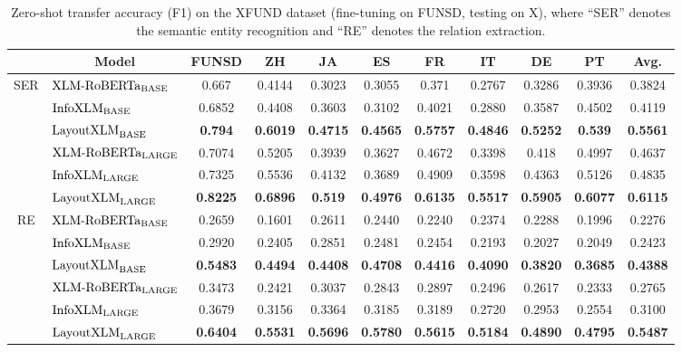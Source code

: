 \documentclass[11pt]{article}
\newcommand{\task}{\textsc{XFUND}\xspace}
\begin{document}
\begin{table*}[ht]
	\small
	\centering
	\begin{tabular}{c|lccccccccc}
		\toprule
& \multicolumn{1}{c}{\bf Model}      & \bf FUNSD & \bf ZH & \bf JA & \bf ES & \bf FR & \bf IT & \bf DE & \bf PT & \bf Avg. \\\midrule
		\multirow{6}{*}{SER} & $\textrm{XLM-RoBERTa}_{\rm BASE}$  & 0.667  & 0.4144 & 0.3023 & 0.3055 & 0.371  & 0.2767 & 0.3286 & 0.3936 & 0.3824 \\
		                    & $\textrm{InfoXLM}_{\rm BASE}$ & 0.6852 & 0.4408 & 0.3603 & 0.3102 & 0.4021 & 0.2880 & 0.3587 & 0.4502 & 0.4119 \\
		                    & $\textrm{LayoutXLM}_{\rm BASE}$    & \bf 0.794  & \bf 0.6019 & \bf 0.4715 & \bf 0.4565 & \bf 0.5757 & \bf 0.4846 & \bf 0.5252 & \bf 0.539 & \bf 0.5561 \\ \cmidrule{2-11}
		                    & $\textrm{XLM-RoBERTa}_{\rm LARGE}$ & 0.7074 & 0.5205 & 0.3939 & 0.3627 & 0.4672 & 0.3398 & 0.418  & 0.4997 & 0.4637 \\
		                    & $\textrm{InfoXLM}_{\rm LARGE}$     & 0.7325 & 0.5536 & 0.4132 & 0.3689 & 0.4909 & 0.3598 & 0.4363 & 0.5126 & 0.4835 \\
		                    & $\textrm{LayoutXLM}_{\rm LARGE}$   & \bf 0.8225 & \bf 0.6896 & \bf 0.519  & \bf 0.4976 & \bf 0.6135 & \bf 0.5517 & \bf 0.5905 & \bf 0.6077 & \bf 0.6115 \\\midrule
		\multirow{6}{*}{RE} & $\textrm{XLM-RoBERTa}_{\rm BASE}$  & 0.2659 & 0.1601 & 0.2611 & 0.2440 & 0.2240 & 0.2374 & 0.2288 & 0.1996 & 0.2276 \\
		                    & $\textrm{InfoXLM}_{\rm BASE}$      & 0.2920 & 0.2405 & 0.2851 & 0.2481 & 0.2454 & 0.2193 & 0.2027 & 0.2049 & 0.2423 \\
		                    & $\textrm{LayoutXLM}_{\rm BASE}$    & \bf 0.5483 & \bf 0.4494 & \bf 0.4408 & \bf 0.4708 & \bf 0.4416 & \bf 0.4090 & \bf 0.3820 & \bf 0.3685 & \bf 0.4388 \\ \cmidrule{2-11}
		                    & $\textrm{XLM-RoBERTa}_{\rm LARGE}$ & 0.3473 & 0.2421 & 0.3037 & 0.2843 & 0.2897 & 0.2496 & 0.2617 & 0.2333 & 0.2765 \\
		                    & $\textrm{InfoXLM}_{\rm LARGE}$     & 0.3679 & 0.3156 & 0.3364 & 0.3185 & 0.3189 & 0.2720 & 0.2953 & 0.2554 & 0.3100 \\
		                    & $\textrm{LayoutXLM}_{\rm LARGE}$   & \bf 0.6404 & \bf 0.5531 & \bf 0.5696 & \bf 0.5780 & \bf 0.5615 & \bf 0.5184 & \bf 0.4890 & \bf 0.4795 \bf & \bf 0.5487 \\
		\bottomrule
	\end{tabular}
	\caption{Zero-shot transfer accuracy (F1) on the \task dataset (fine-tuning on FUNSD, testing on X), where ``SER'' denotes the semantic entity recognition and ``RE'' denotes the relation extraction.}
	\label{tab:e2x}
\end{table*}
\end{document}
